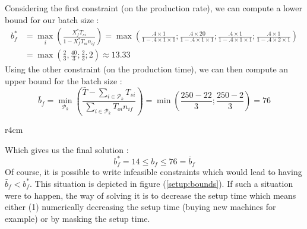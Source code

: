 Considering the first constraint (on the production rate), we can compute a lower bound for our batch size :
\[
    \begin{split}
        b_f^* &= \max_i\left( \frac{X_f^*T_{si}}{1-X_f^*T_{oi}n_{if}} \right) =
        \max\left( \frac{.4\times 1}{1-.4\times 1\times 1} ; \frac{.4\times 20}{1-.4\times 1\times 1} ; \frac{.4\times 1}{1-.4\times 1\times 1} ; \frac{.4\times 1}{1-.4\times 2\times 1} \right)\\
        &= \max\left( \frac 23, \frac{40}3 ; \frac 23 ; 2 \right) \approx 13.33
    \end{split}
\]
Using the other constraint (on the production time), we can then compute an upper bound for the batch size :
\[
    \bar b_f = \min_{\mathcal P_k}\left( \frac{\bar T - \sum_{i\in\mathcal P_k} T_{si}}{\sum_{i\in\mathcal P_k}T_{oi}n_{if}} \right) = \min\left( \frac{250 - 22}{3} ; \frac{250 - 2}{3} \right) = 76
\]

\begin{wrapfigure}[10]{r}{4cm}
    \centering
    \caption{\label{setup:bounds}Batch size}
\end{wrapfigure}

Which gives us the final solution : \[ b_f^* = 14 \le b_f \le 76 = \bar b_f \]
Of course, it is possible to write infeasible constraints which would lead to having $\bar b_f < b_f^*$. This situation is depicted in figure (\ref{setup:bounds}). If such a situation were to happen, the way of solving it is to decrease the setup time which means either (1) numerically decreasing the setup time (buying new machines for example) or by masking the setup time. 